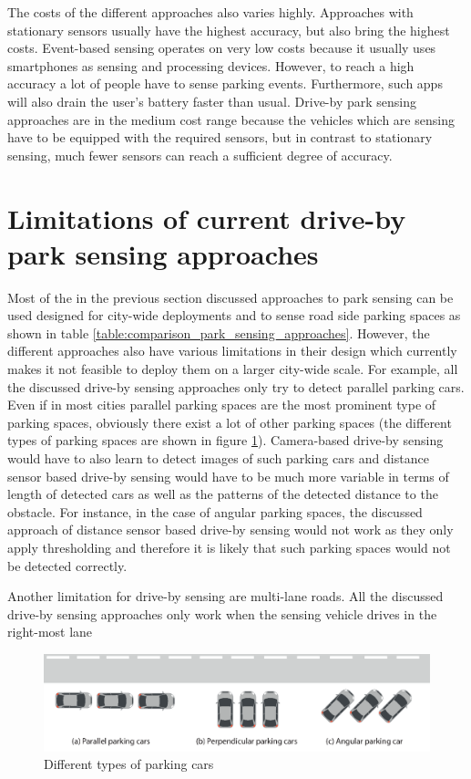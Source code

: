 The costs of the different approaches also varies highly. Approaches with stationary sensors usually have the highest accuracy, but also bring the highest costs. Event-based sensing operates on very low costs because it usually uses smartphones as sensing and processing devices. However, to reach a high accuracy a lot of people have to sense parking events. Furthermore, such apps will also drain the user's battery faster than usual. Drive-by park sensing approaches are in the medium cost range because the vehicles which are sensing have to be equipped with the required sensors, but in contrast to stationary sensing, much fewer sensors can reach a sufficient degree of accuracy.





\section{Limitations of current drive-by park sensing approaches}

Most of the in the previous section discussed approaches to park sensing can be used designed for city-wide deployments and to sense road side parking spaces as shown in table \ref{table:comparison_park_sensing_approaches}. However, the different approaches also have various limitations in their design which currently makes it not feasible to deploy them on a larger city-wide scale. For example, all the discussed drive-by sensing approaches only try to detect parallel parking cars. Even if in most cities parallel parking spaces are the most prominent type of parking spaces, obviously there exist a lot of other parking spaces (the different types of parking spaces are shown in figure \ref{fig:types_of_parking_cars}). Camera-based drive-by sensing would have to also learn to detect images of such parking cars and distance sensor based drive-by sensing would have to be much more variable in terms of length of detected cars as well as the patterns of the detected distance to the obstacle. For instance, in the case of angular parking spaces, the discussed approach of distance sensor based drive-by sensing would not work as they only apply thresholding and therefore it is likely that such parking spaces would not be detected correctly.

Another limitation for drive-by sensing are multi-lane roads. All the discussed drive-by sensing approaches only work when the sensing vehicle drives in the right-most lane

\begin{figure}
	\centering
	\includegraphics[width=\textwidth]{img/types-of-parking-cars.eps}
	\caption{Different types of parking cars}
	\label{fig:types_of_parking_cars}
\end{figure}



